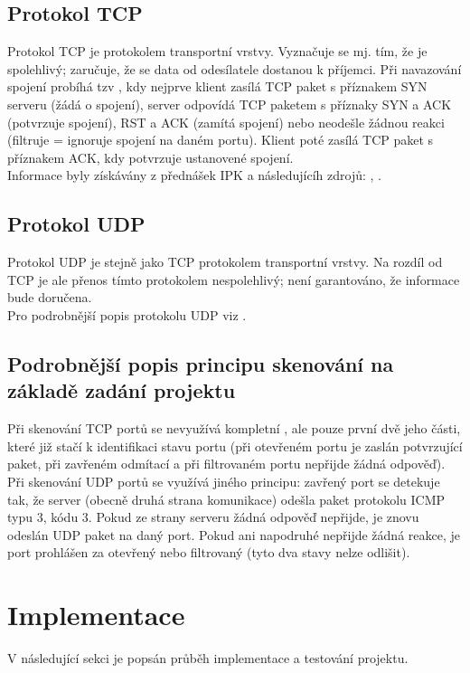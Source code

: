 \documentclass[a4paper, 11pt]{article}
\begin{document}
\subsection{Protokol TCP}
Protokol TCP je protokolem transportní vrstvy. Vyznačuje se mj. tím, že je spolehlivý; zaručuje, že se data od odesílatele dostanou k příjemci. Při navazování spojení probíhá tzv , kdy nejprve klient zasílá TCP paket s příznakem SYN serveru (žádá o spojení), server odpovídá TCP paketem s příznaky SYN a ACK (potvrzuje spojení), RST a ACK (zamítá spojení) nebo neodešle žádnou reakci (filtruje = ignoruje spojení na daném portu). Klient poté zasílá TCP paket s příznakem ACK, kdy potvrzuje ustanovené spojení.\\
Informace byly získávány z přednášek IPK a následujícíh zdrojů: \cite{rfc793}, \cite{Donahoo:TCPIP}.  
\subsection{Protokol UDP}
Protokol UDP je stejně jako TCP protokolem transportní vrstvy. Na rozdíl od TCP je ale přenos tímto protokolem nespolehlivý; není garantováno, že informace bude doručena.\\
Pro podrobnější popis protokolu UDP viz \cite{rfc768}.\\
\subsection{Podrobnější popis principu skenování na základě zadání projektu}
Při skenování TCP portů se nevyužívá kompletní , ale pouze první dvě jeho části, které již stačí k identifikaci stavu portu (při otevřeném portu je zaslán potvrzující paket, při zavřeném odmítací a při filtrovaném portu nepřijde žádná odpověď).\\
Při skenování UDP portů se využívá jiného principu: zavřený port se detekuje tak, že server (obecně druhá strana komunikace) odešla paket protokolu ICMP typu 3, kódu 3. Pokud ze strany serveru žádná odpověď nepřijde, je znovu odeslán UDP paket na daný port. Pokud ani napodruhé nepřijde žádná reakce, je port prohlášen za otevřený nebo filtrovaný (tyto dva stavy nelze odlišit).
\section{Implementace}
V následující sekci je popsán průběh implementace a testování projektu.
\end{document}

